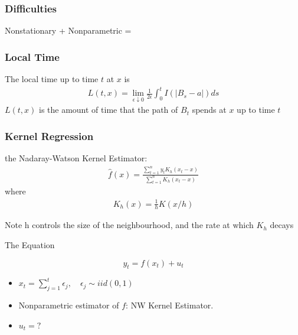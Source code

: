 \documentclass{beamer}
\begin{document}
\begin{frame}[c]\frametitle{Difficulties}
  Nonstationary + Nonparametric =\alert{
  }
\end{frame}

\begin{frame}[t]\frametitle{Local Time}
  \begin{definition}
    The local time up to time $t$ at $x$ is
    \begin{align*}
      L(t,x) = \lim_{\epsilon \downarrow 0} \frac{1}{2 \epsilon} \int_{0}^{t} I(|B_s-a|) ds
    \end{align*}
    \pause
    \alert{$L(t,x)$ is the amount of time that the path of $B_t$ spends at $x$ up to time $t$}
  \end{definition}
\end{frame}

\begin{frame}[c]\frametitle{Kernel Regression}
  the Nadaray-Watson Kernel Estimator:
  \begin{align*}
    \hat{f}(x) = \frac{\sum_{t=1}^{n} y_t K_h(x_t-x)}{\sum_{t=1}^{n} K_h(x_t-x)} 
  \end{align*}
  where
  \begin{align*}
    K_h(x) = \frac{1}{h} K(x/h)
  \end{align*}
  \pause
  \begin{block}{Note}
    h controls the size of the neighbourhood, and the rate at which $K_h$ decays
  \end{block}
\end{frame}

\begin{frame}[t]{The Equation}
  
  \begin{equation*}
    y_t
    = 
    f(x_t) + u_t
  \end{equation*}
  
  \begin{itemize}
    \item $x_t = \sum_{j=1}^{t} \epsilon_j,\quad \epsilon_{j}\sim iid(0,1)$
    \item Nonparametric estimator of $f$: NW Kernel Estimator.
    \item \alert{$u_t = ?$}
  \end{itemize}

\end{frame}
\end{document}
